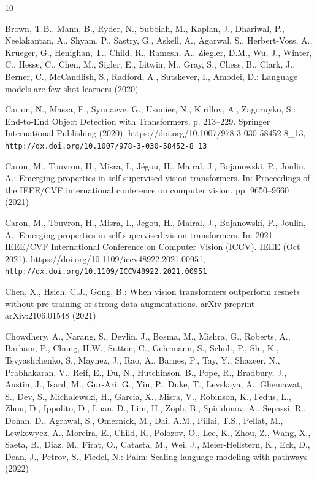 \documentclass[runningheads]{llncs}
\begin{document}

\begin{thebibliography}{10}
\providecommand{\url}[1]{\texttt{#1}}
\providecommand{\urlprefix}{URL }
\providecommand{\doi}[1]{https://doi.org/#1}

Brown, T.B., Mann, B., Ryder, N., Subbiah, M., Kaplan, J., Dhariwal, P., Neelakantan, A., Shyam, P., Sastry, G., Askell, A., Agarwal, S., Herbert-Voss, A., Krueger, G., Henighan, T., Child, R., Ramesh, A., Ziegler, D.M., Wu, J., Winter, C., Hesse, C., Chen, M., Sigler, E., Litwin, M., Gray, S., Chess, B., Clark, J., Berner, C., McCandlish, S., Radford, A., Sutskever, I., Amodei, D.: Language models are few-shot learners (2020)

Carion, N., Massa, F., Synnaeve, G., Usunier, N., Kirillov, A., Zagoruyko, S.: End-to-End Object Detection with Transformers, p. 213–229. Springer International Publishing (2020). \doi{10.1007/978-3-030-58452-8_13}, \url{http://dx.doi.org/10.1007/978-3-030-58452-8_13}

Caron, M., Touvron, H., Misra, I., J{\'e}gou, H., Mairal, J., Bojanowski, P., Joulin, A.: Emerging properties in self-supervised vision transformers. In: Proceedings of the IEEE/CVF international conference on computer vision. pp. 9650--9660 (2021)

Caron, M., Touvron, H., Misra, I., Jegou, H., Mairal, J., Bojanowski, P., Joulin, A.: Emerging properties in self-supervised vision transformers. In: 2021 IEEE/CVF International Conference on Computer Vision (ICCV). IEEE (Oct 2021). \doi{10.1109/iccv48922.2021.00951}, \url{http://dx.doi.org/10.1109/ICCV48922.2021.00951}

Chen, X., Hsieh, C.J., Gong, B.: When vision transformers outperform resnets without pre-training or strong data augmentations. arXiv preprint arXiv:2106.01548  (2021)

Chowdhery, A., Narang, S., Devlin, J., Bosma, M., Mishra, G., Roberts, A., Barham, P., Chung, H.W., Sutton, C., Gehrmann, S., Schuh, P., Shi, K., Tsvyashchenko, S., Maynez, J., Rao, A., Barnes, P., Tay, Y., Shazeer, N., Prabhakaran, V., Reif, E., Du, N., Hutchinson, B., Pope, R., Bradbury, J., Austin, J., Isard, M., Gur-Ari, G., Yin, P., Duke, T., Levskaya, A., Ghemawat, S., Dev, S., Michalewski, H., Garcia, X., Misra, V., Robinson, K., Fedus, L., Zhou, D., Ippolito, D., Luan, D., Lim, H., Zoph, B., Spiridonov, A., Sepassi, R., Dohan, D., Agrawal, S., Omernick, M., Dai, A.M., Pillai, T.S., Pellat, M., Lewkowycz, A., Moreira, E., Child, R., Polozov, O., Lee, K., Zhou, Z., Wang, X., Saeta, B., Diaz, M., Firat, O., Catasta, M., Wei, J., Meier-Hellstern, K., Eck, D., Dean, J., Petrov, S., Fiedel, N.: Palm: Scaling language modeling with pathways (2022)


\end{thebibliography}
\end{document}

